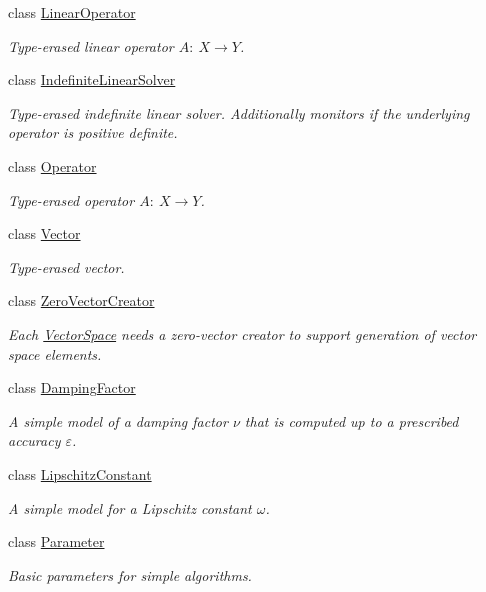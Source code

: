 \begin{DoxyCompactItemize}
class \hyperlink{classSpacy_1_1LinearOperator}{Linear\-Operator}
\begin{DoxyCompactList}\small\item\em Type-\/erased linear operator $A:\ X \to Y $. \end{DoxyCompactList}\item 
class \hyperlink{classSpacy_1_1IndefiniteLinearSolver}{Indefinite\-Linear\-Solver}
\begin{DoxyCompactList}\small\item\em Type-\/erased indefinite linear solver. Additionally monitors if the underlying operator is positive definite. \end{DoxyCompactList}\item 
class \hyperlink{classSpacy_1_1Operator}{Operator}
\begin{DoxyCompactList}\small\item\em Type-\/erased operator $A:\ X \to Y $. \end{DoxyCompactList}\item 
class \hyperlink{classSpacy_1_1Vector}{Vector}
\begin{DoxyCompactList}\small\item\em Type-\/erased vector. \end{DoxyCompactList}\item 
class \hyperlink{classSpacy_1_1ZeroVectorCreator}{Zero\-Vector\-Creator}
\begin{DoxyCompactList}\small\item\em Each \hyperlink{classSpacy_1_1VectorSpace}{Vector\-Space} needs a zero-\/vector creator to support generation of vector space elements. \end{DoxyCompactList}\item 
class \hyperlink{classSpacy_1_1DampingFactor}{Damping\-Factor}
\begin{DoxyCompactList}\small\item\em A simple model of a damping factor $\nu$ that is computed up to a prescribed accuracy $\varepsilon$. \end{DoxyCompactList}\item 
class \hyperlink{classSpacy_1_1LipschitzConstant}{Lipschitz\-Constant}
\begin{DoxyCompactList}\small\item\em A simple model for a Lipschitz constant $\omega$. \end{DoxyCompactList}\item 
class \hyperlink{classSpacy_1_1Parameter}{Parameter}
\begin{DoxyCompactList}\small\item\em Basic parameters for simple algorithms. \end{DoxyCompactList}\item 

\end{DoxyCompactItemize}
